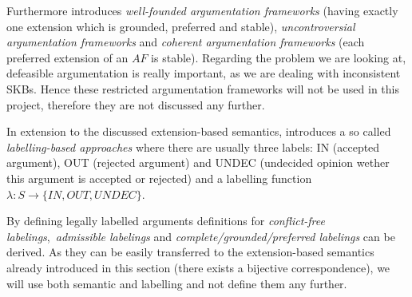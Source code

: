 Furthermore \cite{dung1995} introduces \textit{well-founded argumentation frameworks} (having exactly one extension which is grounded, preferred and stable), \textit{uncontroversial argumentation frameworks} and \textit{coherent argumentation frameworks} (each preferred extension of an $AF$ is stable). Regarding the problem we are looking at, defeasible argumentation is really important, as we are dealing with inconsistent \glspl{SKB}. Hence these restricted argumentation frameworks will not be used in this project, therefore they are not discussed any further.

In extension to the discussed extension-based semantics, \cite{liao} introduces a so called \textit{labelling-based approaches} where there are usually three labels: IN (accepted argument), OUT (rejected argument) and UNDEC (undecided opinion wether this argument is accepted or rejected) and a labelling function $\lambda: S \rightarrow \{IN, OUT, UNDEC\}$.

By defining legally labelled arguments definitions for \textit{conflict-free labelings},~\textit{admissible labelings} and \textit{complete/grounded/preferred labelings} can be derived. As they can be easily transferred to the extension-based semantics already introduced in this section (there exists a bijective correspondence), we will use both semantic and labelling and not define them any further.

